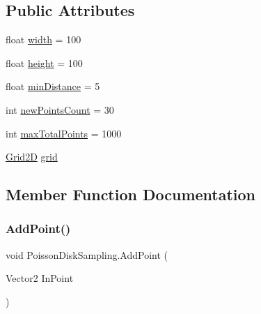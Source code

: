 \subsection*{Public Attributes}
\begin{DoxyCompactItemize}
\item 
float \mbox{\hyperlink{class_poisson_disk_sampling_a0b32f3e1950036797fb17575da924b8e}{width}} = 100
\item 
float \mbox{\hyperlink{class_poisson_disk_sampling_aa75a106477c40f9d1200f3ae71dd544f}{height}} = 100
\item 
float \mbox{\hyperlink{class_poisson_disk_sampling_a5e7060326d72754ea94c25df1d5afbaf}{min\+Distance}} = 5
\item 
int \mbox{\hyperlink{class_poisson_disk_sampling_a2ff267a5d6d3a2f30c613ce52ae48bf8}{new\+Points\+Count}} = 30
\item 
int \mbox{\hyperlink{class_poisson_disk_sampling_a1c7892b887f1405caedef95ab667735e}{max\+Total\+Points}} = 1000
\item 
\mbox{\hyperlink{struct_grid2_d}{Grid2D}} \mbox{\hyperlink{class_poisson_disk_sampling_a7cc5fef43fe82e98bb385d76f4df3727}{grid}}
\end{DoxyCompactItemize}


\subsection{Member Function Documentation}
\mbox{\label{class_poisson_disk_sampling_acfa775a97fe1210f2b28188464f8092b}} 
\subsubsection{\texorpdfstring{Add\+Point()}{AddPoint()}}
{\footnotesize\ttfamily void Poisson\+Disk\+Sampling.\+Add\+Point (\begin{DoxyParamCaption}\item[{Vector2}]{In\+Point }\end{DoxyParamCaption})}

\mbox{\label{class_poisson_disk_sampling_a93700de987a5b4bf64da7cd0db070534}} 
